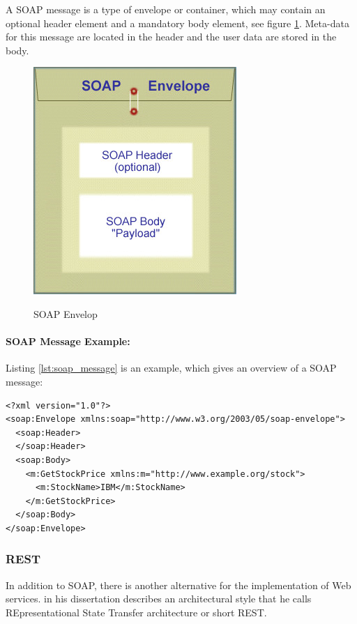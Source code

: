 A SOAP message is a type of envelope or container, which may contain an optional header element and a mandatory body element, see figure \ref{fig:soap_env}. Meta-data for this message are located in the header and the user data are stored in the body.

\begin{figure}[htb]
  \centering
  \includegraphics[scale=0.5]{soap_envelope.jpg}\\
  \caption{SOAP Envelop}
  \label{fig:soap_env}
  \protect\cite{oracle_soap}
\end{figure}

\paragraph{SOAP Message Example:}

Listing \ref{lst:soap_message} is an example, which gives an overview of a SOAP message:

\begin{code}
\begin{verbatim}
<?xml version="1.0"?>
<soap:Envelope xmlns:soap="http://www.w3.org/2003/05/soap-envelope">
  <soap:Header>
  </soap:Header>
  <soap:Body>
    <m:GetStockPrice xmlns:m="http://www.example.org/stock">
      <m:StockName>IBM</m:StockName>
    </m:GetStockPrice>
  </soap:Body>
</soap:Envelope>
\end{verbatim}
\caption{SOAP message example}
\label{lst:soap_message}
\end{code}

\subsubsection{REST\label{sec:back_tech_ws_rest}}
In addition to SOAP, there is another alternative for the implementation of Web services. \citeauthor{Fielding2000} in his dissertation describes an architectural style that he calls REpresentational State Transfer architecture or short REST.

